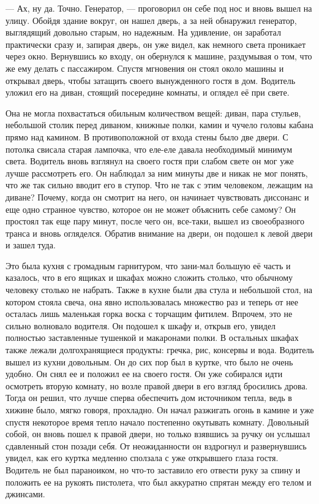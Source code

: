 — Ах, ну да. Точно. Генератор, — проговорил он себе под нос и вновь вышел на улицу. Обойдя здание вокруг, он нашел дверь, а за ней обнаружил генератор, выглядящий довольно старым, но надежным. На удивление, он заработал практически сразу и, запирая дверь, он уже видел, как немного света проникает через окно. Вернувшись ко входу, он обернулся к машине, раздумывая о том, что же ему делать с пассажиром. Спустя мгновения он стоял около машины и открывал дверь, чтобы затащить своего вынужденного гостя в дом. Водитель уложил его на диван, стоящий посередине комнаты, и оглядел её при свете.

Она не могла похвастаться обильным количеством вещей: диван, пара стульев, небольшой столик перед диваном, книжные полки, камин и чучело головы кабана прямо над камином. В противоположной от входа стены было две двери. С потолка свисала старая лампочка, что еле-еле давала необходимый минимум света. Водитель вновь взглянул на своего гостя при слабом свете он мог уже лучше рассмотреть его. Он наблюдал за ним минуты две и никак не мог понять, что же так сильно вводит его в ступор. Что не так с этим человеком, лежащим на диване? Почему, когда он смотрит на него, он начинает чувствовать диссонанс и еще одно странное чувство, которое он не может объяснить себе самому? Он простоял так еще пару минут, после чего он, все-таки, вышел из своеобразного транса и вновь огляделся. Обратив внимание на двери, он подошел к левой двери и зашел туда. 

Это была кухня с громадным гарнитуром, что зани-мал большую её часть и казалось, что в его ящиках и шкафах можно сложить столько, что обычному человеку столько не набрать. Также в кухне были два стула и небольшой стол, на котором стояла свеча, она явно использовалась множество раз и теперь от нее осталась лишь маленькая горка воска с торчащим фитилем. Впрочем, это не сильно волновало водителя. Он подошел к шкафу и, открыв его, увидел полностью заставленные тушенкой и макаронами полки. В остальных шкафах также лежали долгохранящиеся продукты: гречка, рис, консервы и вода. Водитель вышел из кухни довольным. Он до сих пор был в куртке, что было не очень удобно. Он снял ее и положил ее на своего гостя. Он уже собирался идти осмотреть вторую комнату, но возле правой двери в его взгляд бросились дрова. Тогда он решил, что лучше сперва обеспечить дом источником тепла, ведь в хижине было, мягко говоря, прохладно. Он начал разжигать огонь в камине и уже спустя некоторое время тепло начало постепенно окутывать комнату. Довольный собой, он вновь пошел к правой двери, но только взявшись за ручку он услышал сдавленный стон позади себя. От неожиданности он вздрогнул и развернувшись увидел, как его куртка медленно сползала с уже открывшего глаза гостя. Водитель не был параноиком, но что-то заставило его отвести руку за спину и положить ее на рукоять пистолета, что был аккуратно спрятан между его телом и джинсами. 

